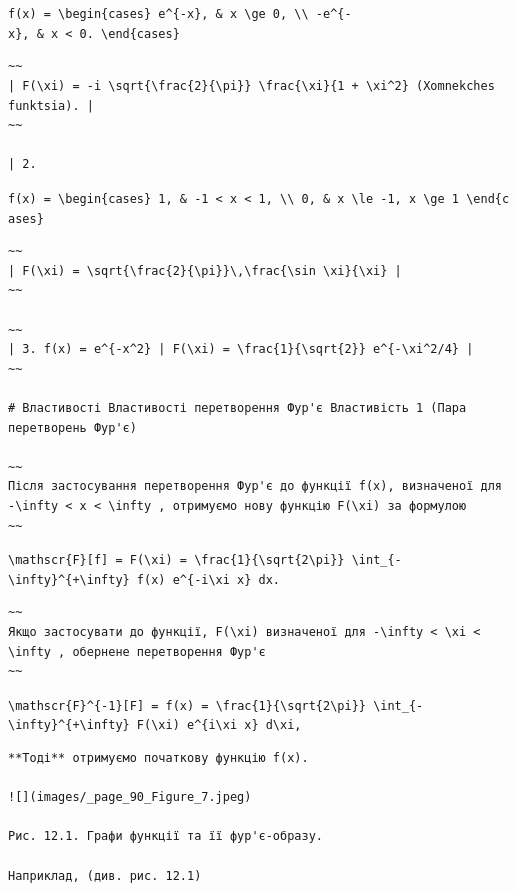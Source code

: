 \documentclass[
  ukrainian,
]{article}
\begin{document}
\texttt{f(x)\ =\ \textbackslash{}begin\{cases\}\ e\^{}\{-x\},\ \&\ x\ \textbackslash{}ge\ 0,\ \textbackslash{}\textbackslash{}\ -e\^{}\{-x\},\ \&\ x\ \textless{}\ 0.\ \textbackslash{}end\{cases\}}

\begin{verbatim}
~~
| F(\xi) = -i \sqrt{\frac{2}{\pi}} \frac{\xi}{1 + \xi^2} (Xomnekches funktsia). |
~~

| 2.
\end{verbatim}

\texttt{f(x)\ =\ \textbackslash{}begin\{cases\}\ 1,\ \&\ -1\ \textless{}\ x\ \textless{}\ 1,\ \textbackslash{}\textbackslash{}\ 0,\ \&\ x\ \textbackslash{}le\ -1,\ x\ \textbackslash{}ge\ 1\ \textbackslash{}end\{cases\}}

\begin{verbatim}
~~
| F(\xi) = \sqrt{\frac{2}{\pi}}\,\frac{\sin \xi}{\xi} |
~~

~~
| 3. f(x) = e^{-x^2} | F(\xi) = \frac{1}{\sqrt{2}} e^{-\xi^2/4} |
~~

# Властивості Властивості перетворення Фур'є Властивість 1 (Пара перетворень Фур'є)

~~
Після застосування перетворення Фур'є до функції f(x), визначеної для -\infty < x < \infty , отримуємо нову функцію F(\xi) за формулою
~~
\end{verbatim}

\texttt{\textbackslash{}mathscr\{F\}{[}f{]}\ =\ F(\textbackslash{}xi)\ =\ \textbackslash{}frac\{1\}\{\textbackslash{}sqrt\{2\textbackslash{}pi\}\}\ \textbackslash{}int\_\{-\textbackslash{}infty\}\^{}\{+\textbackslash{}infty\}\ f(x)\ e\^{}\{-i\textbackslash{}xi\ x\}\ dx.}

\begin{verbatim}
~~
Якщо застосувати до функції, F(\xi) визначеної для -\infty < \xi < \infty , обернене перетворення Фур'є
~~
\end{verbatim}

\texttt{\textbackslash{}mathscr\{F\}\^{}\{-1\}{[}F{]}\ =\ f(x)\ =\ \textbackslash{}frac\{1\}\{\textbackslash{}sqrt\{2\textbackslash{}pi\}\}\ \textbackslash{}int\_\{-\textbackslash{}infty\}\^{}\{+\textbackslash{}infty\}\ F(\textbackslash{}xi)\ e\^{}\{i\textbackslash{}xi\ x\}\ d\textbackslash{}xi,}

\begin{verbatim}
**Тоді** отримуємо початкову функцію f(x).

![](images/_page_90_Figure_7.jpeg)

Рис. 12.1. Графи функції та її фур'є-образу.

Наприклад, (див. рис. 12.1)
\end{verbatim}
\end{document}
